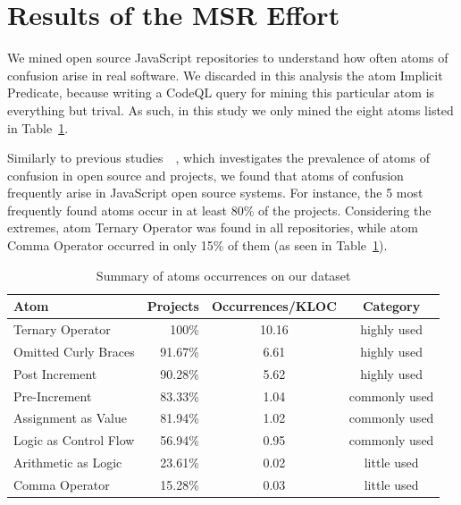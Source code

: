\section{Results of the MSR Effort}
\label{sec:msr-results} 

We mined \minedprojects open source JavaScript repositories to understand how often atoms of confusion arise in real software. We discarded in this analysis the atom Implicit Predicate,
because writing a CodeQL query for mining this particular atom is everything but trival.
As such, in this study
we only mined the eight atoms listed in Table~\ref{tab:occurrences-summary}.

Similarly to previous studies~\cite{DBLP:conf/msr/GopsteinZFC18}~\cite{DBLP:journals/ese/MedeirosLAAKRG19}, which investigates the prevalence of atoms of confusion in open source \clang and \cpplang projects, we found that atoms of confusion frequently arise in JavaScript open source systems. For instance, the 5 most frequently found atoms occur in at least 80\% of the projects.
Considering the extremes, atom Ternary Operator was found in all repositories,
while atom Comma Operator occurred in only 15\% of them (as seen in Table~\ref{tab:occurrences-summary}).




\begin{table}[!htb]
\centering
 \caption{Summary of atoms occurrences on our dataset}
 
\setlength\tabcolsep{2pt} %
\label{tab:occurrences-summary}
\begin{tabular}{lrcc}

  \hline
Atom & Projects & Occurrences/KLOC & Category \\ 
 \hline
Ternary Operator & 100\% & 10.16 &  highly used \\ 
Omitted Curly Braces & 91.67\% & 6.61 &  highly used \\ 
Post Increment & 90.28\% & 5.62 &  highly used \\ 
Pre-Increment & 83.33\% & 1.04 & commonly used \\ 
Assignment as Value & 81.94\% & 1.02 & commonly used \\ 
Logic as Control Flow & 56.94\% & 0.95 & commonly used \\ 
Arithmetic as Logic & 23.61\% & 0.02 & little used \\ 
Comma Operator & 15.28\% & 0.03 & little used \\ 
   \hline
\end{tabular}
\end{table}


